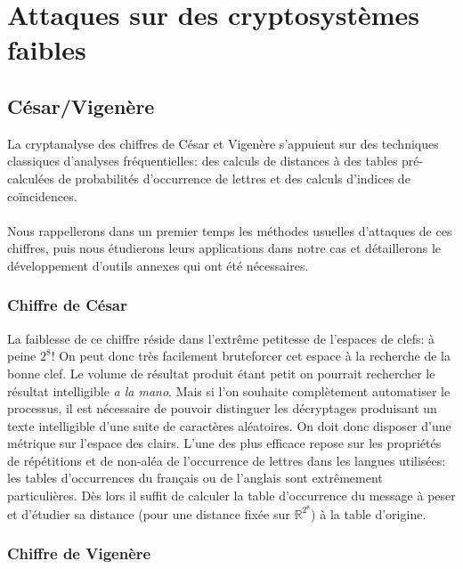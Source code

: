 \documentclass[11pt]{article} %
\begin{document}
\section{Attaques sur des cryptosystèmes faibles}

\subsection{César/Vigenère}


 La cryptanalyse des chiffres de César et Vigenère s'appuient sur des techniques classiques d'analyses
fréquentielles: des calculs de distances à des tables pré-calculées de probabilités d'occurrence de lettres et des calculs d'indices de coïncidences.\\\\
    Nous rappellerons dans un premier temps les méthodes usuelles d'attaques de ces chiffres, puis nous étudierons leurs applications dans notre cas et détaillerons le développement d'outils annexes qui ont été nécessaires.

\subsubsection{Chiffre de César}

    La faiblesse de ce chiffre réside dans l'extrême petitesse de l'espaces de clefs: à peine $2^8$! On peut donc très facilement bruteforcer cet espace à la recherche de la bonne clef. Le volume de résultat produit étant petit on pourrait rechercher le résultat intelligible \emph{a la mano}. Mais si l'on souhaite complètement automatiser le processus, il est nécessaire de pouvoir distinguer les décryptages produisant un texte intelligible d'une suite de caractères aléatoires. On doit donc disposer d'une métrique sur l'espace des clairs. L'une des plus efficace repose sur les propriétés de répétitions et de non-aléa de l'occurrence de lettres dans les langues utilisées: les tables d’occurrences du français ou de l'anglais sont extrêmement particulières. Dès lors il suffit de calculer la table d’occurrence du message à peser et d'étudier sa distance (pour une distance fixée sur $\mathbb{R}^{2^8}$) à la table d'origine.

\subsubsection{Chiffre de Vigenère}
\end{document}
